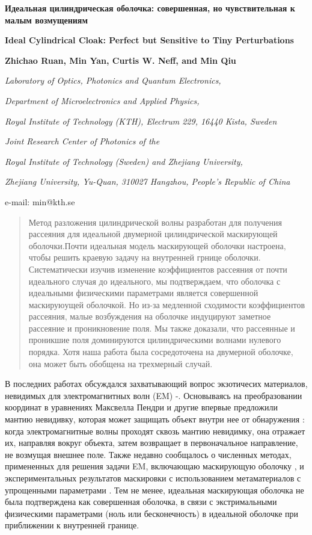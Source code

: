 \documentclass[a4paper, 12pt]{article}
\newcommand{\tit}[1]{\begin{center}{\bf{\Large #1}}\end{center}}
\newcommand{\aut}[1]{\centerline{{\bf #1}}}
\newcommand{\cityorg}[1]{\centerline{\it #1}}
\newcommand{\email}[1]{\centerline{{\small e-mail: #1}}\vspace{\baselineskip}}
\begin{document}
\sloppy

 \tit{Идеальная цилиндрическая оболочка: совершенная, но чувствительная к малым возмущениям}
 \tit{Ideal Cylindrical Cloak: Perfect but Sensitive to Tiny Perturbations}
 \aut{Zhichao Ruan, Min Yan, Curtis W. Neff, and Min Qiu}
 \cityorg{Laboratory of Optics, Photonics and Quantum Electronics,} 
 \cityorg{Department of Microelectronics and Applied Physics,} 
 \cityorg{Royal Institute of Technology (KTH), Electrum 229, 16440 Kista, Sweden}
 \cityorg{Joint Research Center of Photonics of the}
 \cityorg{Royal Institute of Technology (Sweden) and Zhejiang University,}
 \cityorg{Zhejiang University, Yu-Quan, 310027 Hangzhou, People’s Republic of China}
 \email{min@kth.se}

\begin{abstract}
Метод разложения цилиндрической волны разработан для получения рассеяния для идеальной двумерной цилиндрической
маскирующей оболочки.Почти идеальная модель маскирующей оболочки настроена, чтобы решить краевую задачу на внутренней
грнице оболочки. Систематически изучив изменение коэффициентов рассеяния от почти идеального случая до идеального, мы
подтверждаем, что оболочка с идеальными физическими параметрами является совершенной маскируюущей оболочкой. Но из-за
медленной сходимости коэффициентов рассеяния, малые возбуждения на оболочке индуцируют заметное рассеяние и проникновение
поля. Мы также доказали, что рассеянные и проникшие поля доминируются цилиндрическими волнами нулевого порядка. Хотя
наша работа была сосредоточена на двумерной оболочке, она может быть обобщена на трехмерный случай. 
\end{abstract}

В последних работах обсуждался захватывающий вопрос экзотичесих материалов, невидимых для электромагнитных волн
(EM) \cite{1}-\cite{11}. Основываясь на преобразовании координат в уравнениях Максвелла Пендри и другие впервые
предложили мантию невидивку, которая может защищать объект внутри нее от обнаружения \cite{1}: когда 
электромагнитные волны проходят сквозь мантию невидимку, она отражает их, направляя вокруг объекта, затем
возвращает в первоначальное направление, не возмущая внешнее поле. Также недавно сообщалось о численных методах,
примененных для решения задачи EM, включающаю маскирующую оболочку \cite{6,9}, и экспериментальных результатов 
маскировки с использованием метаматериалов с упрощенными параметрами \cite{7}. Тем не менее, идеальная маскирующая 
оболочка не была подтверждена как совершенная оболочка, в связи с экстримальными физическими параметрами (ноль 
или бесконечность) в идеальной оболочке при приближении к внутренней границе.
\end{document}
